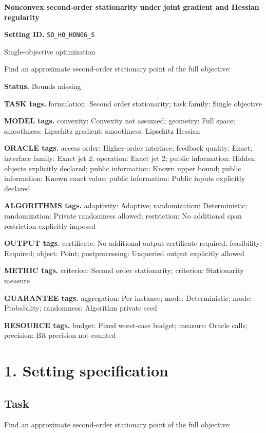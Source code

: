 \documentclass[10pt,a4paper]{article}
\begin{document}
\raggedright

{\LARGE\bfseries\sffamily\color{AtlasNavy} Nonconvex second-order stationarity under joint gradient and Hessian regularity\par}\vspace{5pt}
\textbf{Setting ID.} \texttt{SO\_\allowbreak{}HO\_\allowbreak{}HON06\_\allowbreak{}S}

Single-objective optimization

Find an approximate second-order stationary point of the full objective:

\textbf{Status.} Bounds missing

\textbf{TASK tags.} formulation: Second order stationarity; task family: Single objective

\textbf{MODEL tags.} convexity: Convexity not assumed; geometry: Full space; smoothness: Lipschitz gradient; smoothness: Lipschitz Hessian

\textbf{ORACLE tags.} access order: Higher-order interface; feedback quality: Exact; interface family: Exact jet 2; operation: Exact jet 2; public information: Hidden objects explicitly declared; public information: Known upper bound; public information: Known exact value; public information: Public inputs explicitly declared

\textbf{ALGORITHMS tags.} adaptivity: Adaptive; randomization: Deterministic; randomization: Private randomness allowed; restriction: No additional span restriction explicitly imposed

\textbf{OUTPUT tags.} certificate: No additional output certificate required; feasibility: Required; object: Point; postprocessing: Unqueried output explicitly allowed

\textbf{METRIC tags.} criterion: Second order stationarity; criterion: Stationarity measure

\textbf{GUARANTEE tags.} aggregation: Per instance; mode: Deterministic; mode: Probability; randomness: Algorithm private seed

\textbf{RESOURCE tags.} budget: Fixed worst-case budget; measure: Oracle calls; precision: Bit precision not counted

\section{1. Setting specification}
\subsection{Task}
Find an approximate second-order stationary point of the full objective:
\end{document}
